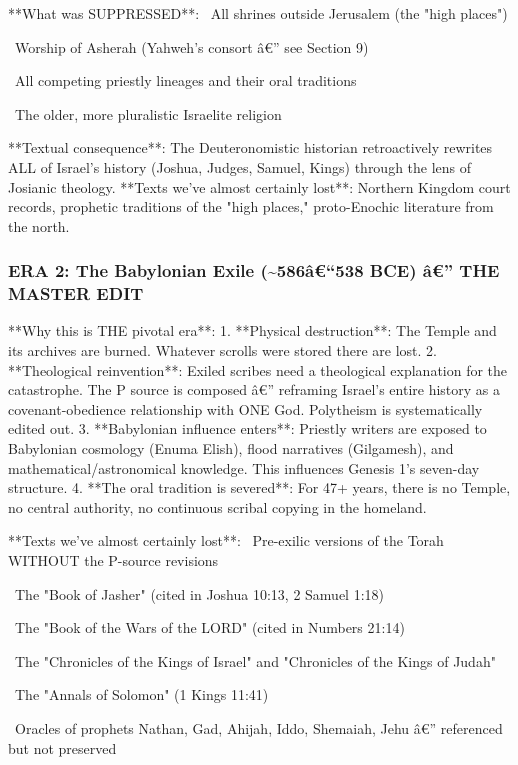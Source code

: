 \documentclass[aps,prd,11pt,onecolumn,superscriptaddress,nofootinbib,floatfix]{revtex4-2}
\begin{document}
**What was SUPPRESSED**:
\textbullet~All shrines outside Jerusalem (the "high places")

\textbullet~Worship of Asherah (Yahweh's consort â€'' see Section 9)

\textbullet~All competing priestly lineages and their oral traditions

\textbullet~The older, more pluralistic Israelite religion



**Textual consequence**: The Deuteronomistic historian retroactively rewrites ALL of Israel's history (Joshua, Judges, Samuel, Kings) through the lens of Josianic theology. **Texts we've almost certainly lost**: Northern Kingdom court records, prophetic traditions of the "high places," proto-Enochic literature from the north.


\subsubsection{ERA 2: The Babylonian Exile (\textasciitilde{}586â€``538 BCE) â€'' THE MASTER EDIT}


**Why this is THE pivotal era**:
1. **Physical destruction**: The Temple and its archives are burned. Whatever scrolls were stored there are lost.
2. **Theological reinvention**: Exiled scribes need a theological explanation for the catastrophe. The P source is composed â€'' reframing Israel's entire history as a covenant-obedience relationship with ONE God. Polytheism is systematically edited out.
3. **Babylonian influence enters**: Priestly writers are exposed to Babylonian cosmology (Enuma Elish), flood narratives (Gilgamesh), and mathematical/astronomical knowledge. This influences Genesis 1's seven-day structure.
4. **The oral tradition is severed**: For 47+ years, there is no Temple, no central authority, no continuous scribal copying in the homeland.


**Texts we've almost certainly lost**:
\textbullet~Pre-exilic versions of the Torah WITHOUT the P-source revisions

\textbullet~The "Book of Jasher" (cited in Joshua 10:13, 2 Samuel 1:18)

\textbullet~The "Book of the Wars of the LORD" (cited in Numbers 21:14)

\textbullet~The "Chronicles of the Kings of Israel" and "Chronicles of the Kings of Judah"

\textbullet~The "Annals of Solomon" (1 Kings 11:41)

\textbullet~Oracles of prophets Nathan, Gad, Ahijah, Iddo, Shemaiah, Jehu â€'' referenced but not preserved
\end{document}
